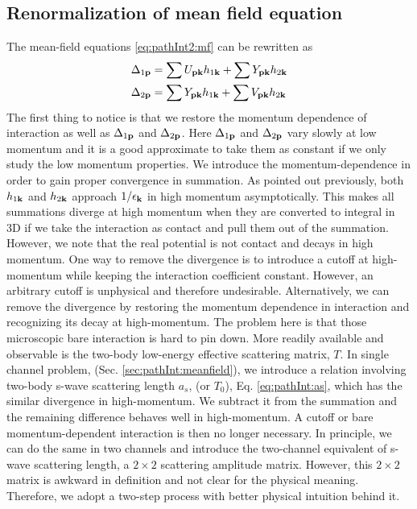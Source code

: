 \subsection {Renormalization of mean field equation\label{sec:pathInt2:ren}}
The mean-field equations \ref{eq:pathInt2:mf} can be rewritten as 
\begin{align}
\Delta_{1\mathbf{p}}&=\sum{}U_{\mathbf{p}\mathbf{k}}h_{1\mathbf{k}}+\sum{}Y_{\mathbf{p}\mathbf{k}}h_{2\mathbf{k}}\label{eq:pathInt2:mfopen}\\
\Delta_{2\mathbf{p}}&=\sum{}Y_{\mathbf{p}\mathbf{k}}h_{1\mathbf{k}}+\sum{}V_{\mathbf{p}\mathbf{k}}h_{2\mathbf{k}}\label{eq:pathInt2:mfclose}
\end{align}
The first thing to notice is that we restore the momentum dependence of interaction as well as $\Delta_{1\mathbf{p}}$ and $\Delta_{2\mathbf{p}}$.     Here $\Delta_{1\mathbf{p}}$ and $\Delta_{2\mathbf{p}}$ vary slowly at low momentum and  it is a good approximate to take them as constant if we only study the low momentum properties.  We introduce the momentum-dependence in order to gain proper convergence in summation. As pointed out previously, both $h_{1\mathbf{k}}$ and $h_{2\mathbf{k}}$ approach $1/\epsilon_{\mathbf{k}}$ in high momentum asymptotically.  This  makes  all summations diverge at high momentum when they are converted to integral in 3D if we take the interaction as contact and pull them out of the summation.  However, we note that the real potential is not contact and decays in high momentum.  One way to remove the divergence is to  introduce  a cutoff at high-momentum while keeping the interaction coefficient constant.  However, an arbitrary cutoff is unphysical and therefore undesirable.  Alternatively, we can remove the divergence by restoring the momentum dependence in interaction and recognizing its decay at high-momentum.    The problem here is that those microscopic bare interaction is hard to pin down.      More readily available and observable is the two-body low-energy effective scattering matrix, $T$.             In single channel problem, (Sec. \ref{sec:pathInt:meanfield}),  we  introduce a relation involving two-body s-wave scattering length $a_{s}$, (or $T_{0}$), Eq. \eqref{eq:pathInt:as}, which has the similar divergence in high-momentum.  We subtract it from the summation and the remaining difference behaves well in high-momentum.  A cutoff or bare momentum-dependent interaction is then no longer necessary.  In principle, we can do the same in two channels and introduce the two-channel equivalent of s-wave scattering length, a $2\times2$ scattering amplitude matrix.  However, this $2\times2$ matrix is awkward in definition and not clear for the physical meaning.   Therefore, we adopt a two-step process with better physical intuition behind it.   

